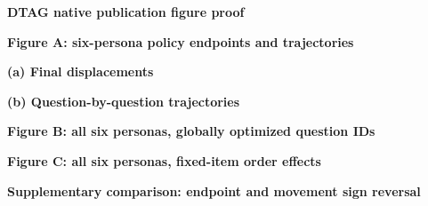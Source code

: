 \documentclass[10pt]{article}
\begin{document}
\begin{center}\Large\bfseries DTAG native publication figure proof\end{center}
\begin{center}\bfseries Figure A: six-persona policy endpoints and trajectories\end{center}
\begin{minipage}[t]{.487\textwidth}
\centering\vspace{0pt}
\footnotesize\textbf{(a) Final displacements}\par\vspace{1mm}

\end{minipage}\hfill
\begin{minipage}[t]{.487\textwidth}
\centering\vspace{0pt}
\footnotesize\textbf{(b) Question-by-question trajectories}\par\vspace{1mm}

\end{minipage}
\clearpage
\noindent\begin{minipage}{\textwidth}
\centering
{\Large\bfseries Figure B: all six personas, globally optimized question IDs}\par\vspace{1mm}

\end{minipage}
\clearpage
\begin{center}\Large\bfseries Figure C: all six personas, fixed-item order effects\end{center}
\vspace{1mm}\begin{center}\end{center}
\clearpage
\begin{center}\Large\bfseries Supplementary comparison: endpoint and movement sign reversal\end{center}
\vspace{1mm}\begin{center}\end{center}
\end{document}
